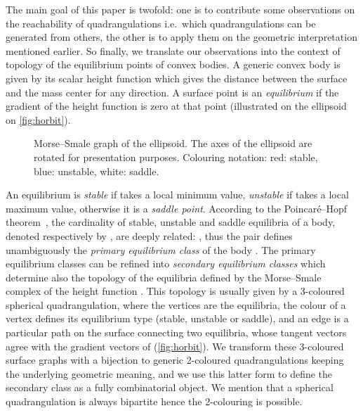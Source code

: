 \documentclass[]{article}
\begin{document}
The main goal of this paper is twofold: one is to contribute some observations on the reachability of quadrangulations i.e.\  which quadrangulations can be generated from others, the other is to apply them on the geometric interpretation mentioned earlier.
So finally, we translate our observations into the context of topology of the equilibrium points of convex bodies.
A generic convex body is given by its scalar height function  which gives the distance between the surface and the mass center for any direction.
A surface point is an \emph{equilibrium} if the gradient of the height function  is zero at that point (illustrated on the ellipsoid on \autoref{fig:horbit}).
\begin{figure}


  \caption{Morse--Smale graph of the ellipsoid.
The axes of the ellipsoid are rotated for presentation purposes.
Colouring notation:  red: stable, blue: unstable, white: saddle.
}
  \label{fig:horbit}
\end{figure}
An equilibrium is \emph{stable} if  takes a local minimum value, \emph{unstable} if  takes a local maximum value, otherwise it is a \emph{saddle point}.
According to the Poincaré--Hopf theorem~\cite{Arnold1978}, the cardinality of stable, unstable and saddle equilibria of a body, denoted respectively by , are deeply related: ,
thus the pair  defines unambiguously the \emph{primary equilibrium class} of the body \cite{Domokos2006}.
The primary equilibrium classes can be refined into \emph{secondary equilibrium classes} which determine also the topology of the equilibria defined by the Morse--Smale complex of the height function  \cite{Domokos2012}.
This topology is usually given by a 3-coloured spherical quadrangulation,
where the vertices are the equilibria, the colour of a vertex defines its equilibrium type (stable, unstable or saddle), and
an edge is a particular path on the surface connecting two equilibria, whose tangent vectors agree with the gradient vectors of  (\autoref{fig:horbit}).
We transform these 3-coloured surface graphs with a bijection to generic 2-coloured quadrangulations keeping the underlying geometric meaning, and we use this latter form to define the secondary class as a fully combinatorial object.
We mention that a spherical quadrangulation is always bipartite \cite{Archdeacon2001,Gross2004} hence the 2-colouring is possible.
\end{document}
